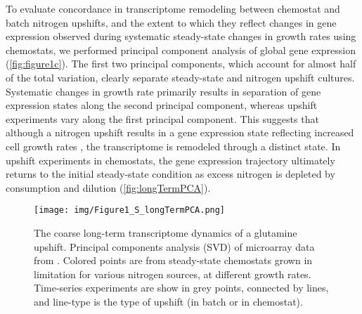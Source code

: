 
To evaluate concordance in transcriptome remodeling between chemostat
and batch nitrogen upshifts, and the extent to which they reflect
changes in gene expression observed during systematic steady-state 
changes in growth rates using chemostats, we
performed principal component analysis of global gene expression
(\autoref{fig:figure1c}). The first two principal components, which
account for almost half of the total variation, clearly separate
steady-state and nitrogen upshift cultures.  Systematic changes in
growth rate primarily results in
separation of gene expression states along the second principal
component, whereas upshift experiments vary along the first 
principal component.  This suggests that
although a nitrogen upshift results in a gene expression state 
reflecting increased cell growth rates \parencite{airoldi2016steady}, the
transcriptome is remodeled through a distinct state. 
In upshift experiments in
chemostats, the gene expression trajectory ultimately returns to 
the initial steady-state condition as excess nitrogen is 
depleted by consumption and dilution 
(\autoref{fig:longTermPCA}). 

\begin{figure}[h]
  \texttt{[image: img/Figure1\_S\_longTermPCA.png]}
  \caption{
  The coarse long-term transcriptome dynamics of a glutamine upshift. 
  Principal components analysis (SVD) of microarray data from 
  \cite{airoldi2016steady}. 
  Colored points are from steady-state chemostats grown in
  limitation for various nitrogen sources, at different growth rates.
  Time-series experiments are show in grey points, connected by lines,
  and line-type is the type of upshift (in batch or in chemostat).
  \label{fig:longTermPCA}
  }
\end{figure}

